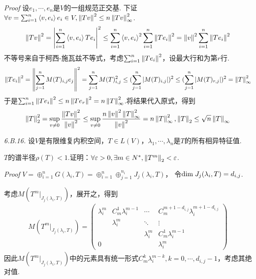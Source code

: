 \textit{Proof}
设\(e_1,\cdots,e_n\)是\(V\)的一组规范正交基.
下证\(\forall v=\sum_{i=1}^n \left\langle v,e_i \right\rangle e_i \in V,\left\lVert Tv \right\rVert^2 \leq n \left\lVert Tv \right\rVert_{\infty}^2\).
    \begin{align*}
        \left\lVert Tv \right\rVert^2=\left\lvert \sum_{i=1}^n \left\langle v,e_i \right\rangle Te_i \right\rvert^2 \leq \sum_{i=1}^n \left\langle v,e_i \right\rangle^2 \sum_{i=1}^n \left\lVert Te_i \right\rVert^2 
        =\left\lVert v \right\rVert^2 \sum_{i=1}^n \left\lVert Te_i \right\rVert^2
    \end{align*}
不等号来自于柯西-施瓦兹不等式，考虑\(\sum_{i=1}^n \left\lVert Te_i \right\rVert^2\)，设最大行和为第\(r\)行.
    \begin{align*}
        \left\lVert Te_i \right\rVert^2=\left\lVert \sum_{j=1}^n M(T)_{i,j}e_j \right\rVert^2=\sum_{j=1}^n M(T)_{i,j}^2
        \leq (\sum_{j=1}^n \left\lvert M(T)_{i,j} \right\rvert)^2 \leq (\sum_{j=1}^n \left\lvert M(T)_{r,j} \right\rvert)^2=\left\lVert T \right\rVert_{\infty}^2
    \end{align*}
于是\(\sum_{i=1}^n \left\lVert Te_i \right\rVert^2 \leq n\left\lVert Te_r \right\rVert^2=n\left\lVert T \right\rVert_{\infty}^2\).将结果代入原式，得到
    \begin{align*}
        \left\lVert T \right\rVert_2^2=\sup_{v \ne 0} \dfrac{\left\lVert Tv \right\rVert^2}{\left\lVert v \right\rVert^2} 
        \leq \sup_{v \ne 0} \dfrac{n \left\lVert v \right\rVert^2 \left\lVert T \right\rVert_{\infty}^2}{\left\lVert v \right\rVert^2}=n \left\lVert T \right\rVert_{\infty}^2,
        \left\lVert T \right\rVert_2 \leq \sqrt{n}\left\lVert T \right\rVert_{\infty}
    \end{align*}

\newpage

\textit{6.B.16.}
设\(V\)是有限维复内积空间，\(T \in L(V)\)，\(\lambda_1,\cdots,\lambda_n\)是\(T\)的所有相异特征值.

\(T\)的谱半径\(\rho(T)<1\).证明：\(\forall \varepsilon>0,\exists m \in N^*,\left\lVert T^m \right\rVert_2<\varepsilon\).

\textit{Proof}
\(V=\oplus_{i=1}^n G(\lambda_i,T)=\oplus_{i=1}^n\oplus_{j=1}^{n_i} J_j(\lambda_i,T)\)，
令\(\mathrm{dim \;} J_j(\lambda_i,T)=d_{i,j}\).

考虑\(M(T^m|_{J_j(\lambda_i,T)})\)，展开之，得到
    \begin{align*}
        M(T^m|_{J_j(\lambda_i,T)})=
        \begin{pmatrix}
            \lambda_i^m & C_m^1 \lambda_i^{m-1} & \cdots      & C_m^{m+1-d_{i,j}} \lambda_i^{m+1-d_{i,j}} \\
                        & \lambda_i^m           & \ddots      & \vdots                                    \\
                        &                       & \lambda_i^m & C_m^1 \lambda_i^{m-1}                     \\
                 0      &                       &             & \lambda_i^m
        \end{pmatrix}
    \end{align*}
因此\(M(T^m|_{J_j(\lambda_i,T)})\)中的元素具有统一形式\(C_m^k \lambda_i^{m-k},k=0,\cdots,d_{i,j}-1\)，考虑其绝对值.

